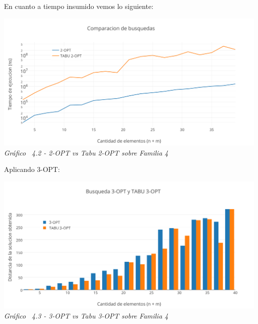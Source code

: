 En cuanto a tiempo insumido vemos lo siguiente:

\vspace*{0.3cm} \vspace*{0.3cm}
  \begin{center}
 \includegraphics[scale=0.5]{./EJ4/medicion2optgym0.png}\\
 {            \textit{Gráfico \ 4.2 - 2-OPT vs Tabu 2-OPT sobre Familia 4}}
  \end{center}
  \vspace*{0.3cm}
  
 Aplicando 3-OPT:

\vspace*{0.3cm} \vspace*{0.3cm}
  \begin{center}
 \includegraphics[scale=0.5]{./EJ4/comparativogym03opt.png}\\
 {            \textit{Gráfico \ 4.3 - 3-OPT vs Tabu 3-OPT sobre Familia 4}}
  \end{center}
  \vspace*{0.3cm}

